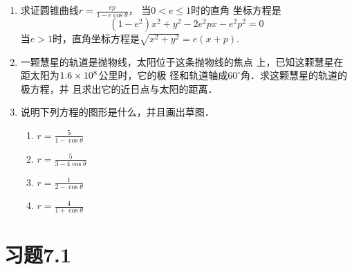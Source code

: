 \begin{ex}
\begin{enumerate}
    \item 求证圆锥曲线$r=\frac{ep}{1-e\cos\theta}$，
    当$0<e\le 1$时的直角
    坐标方程是
    \[(1-e^2)x^2+y^2-2e^2px-e^2p^2=0\]
    当$e>1$时，直角坐标方程是$\sqrt{x^2+y^2}=e(x+p)$.
    \item 一颗慧星的轨道是抛物线，太阳位于这条抛物线的焦点
    上，已知这颗慧星在距太阳为$1.6\times10^8$公里时，它的极
    径和轨道轴成$60^{\circ}$角．求这颗慧星的轨道的极方程，并
    且求出它的近日点与太阳的距离．
    \item 说明下列方程的图形是什么，并且画出草图．
\begin{multicols}{2}
    \begin{enumerate}
        \item $r=\frac{5}{1-\cos\theta}$
        \item $r=\frac{5}{3-4\cos\theta}$
        \item $r=\frac{1}{2-\cos\theta}$
        \item $r=\frac{4}{1+\cos\theta}$
    \end{enumerate}
\end{multicols}
\end{enumerate}
\end{ex}

\section*{习题7.1}

